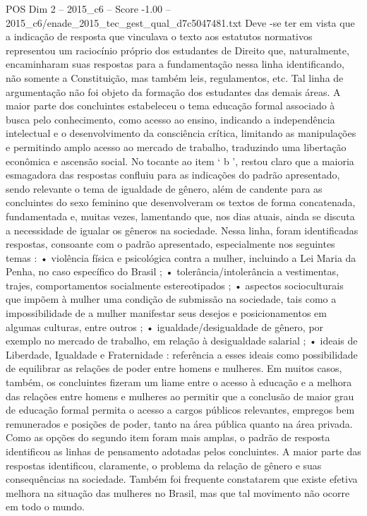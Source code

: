 \begin{textsample}{POS Dim 2 – 2015\_c6 – Score -1.00 – 2015\_c6/enade\_2015\_tec\_gest\_qual\_d7c5047481.txt}
Deve -se ter em vista que a indicação de resposta que vinculava o texto aos estatutos normativos representou um raciocínio próprio dos estudantes de Direito que, naturalmente, encaminharam suas respostas para a fundamentação nessa linha identificando, não somente a Constituição, mas também leis, regulamentos, etc.
Tal linha de argumentação não foi objeto da formação dos estudantes das demais áreas.
A maior parte dos concluintes estabeleceu o tema educação formal associado à busca pelo conhecimento, como acesso ao ensino, indicando a independência intelectual e o desenvolvimento da consciência crítica, limitando as manipulações e permitindo amplo acesso ao mercado de trabalho, traduzindo uma libertação econômica e ascensão social.
No tocante ao item ‘ b ’, restou claro que a maioria esmagadora das respostas confluiu para as indicações do padrão apresentado, sendo relevante o tema de igualdade de gênero, além de candente para as concluintes do sexo feminino que desenvolveram os textos de forma concatenada, fundamentada e, muitas vezes, lamentando que, nos dias atuais, ainda se discuta a necessidade de igualar os gêneros na sociedade.
Nessa linha, foram identificadas respostas, consoante com o padrão apresentado, especialmente nos seguintes temas : • violência física e psicológica contra a mulher, incluindo a Lei Maria da Penha, no caso específico do Brasil ; • tolerância/intolerância a vestimentas, trajes, comportamentos socialmente estereotipados ; • aspectos socioculturais que impõem à mulher uma condição de submissão na sociedade, tais como a impossibilidade de a mulher manifestar seus desejos e posicionamentos em algumas culturas, entre outros ; • igualdade/desigualdade de gênero, por exemplo no mercado de trabalho, em relação à desigualdade salarial ; • ideais de Liberdade, Igualdade e Fraternidade : referência a esses ideais como possibilidade de equilibrar as relações de poder entre homens e mulheres.
Em muitos casos, também, os concluintes fizeram um liame entre o acesso à educação e a melhora das relações entre homens e mulheres ao permitir que a conclusão de maior grau de educação formal permita o acesso a cargos públicos relevantes, empregos bem remunerados e posições de poder, tanto na área pública quanto na área privada.
Como as opções do segundo item foram mais amplas, o padrão de resposta identificou as linhas de pensamento adotadas pelos concluintes.
A maior parte das respostas identificou, claramente, o problema da relação de gênero e suas consequências na sociedade.
Também foi frequente constatarem que existe efetiva melhora na situação das mulheres no Brasil, mas que tal movimento não ocorre em todo o mundo.

\end{textsample}

